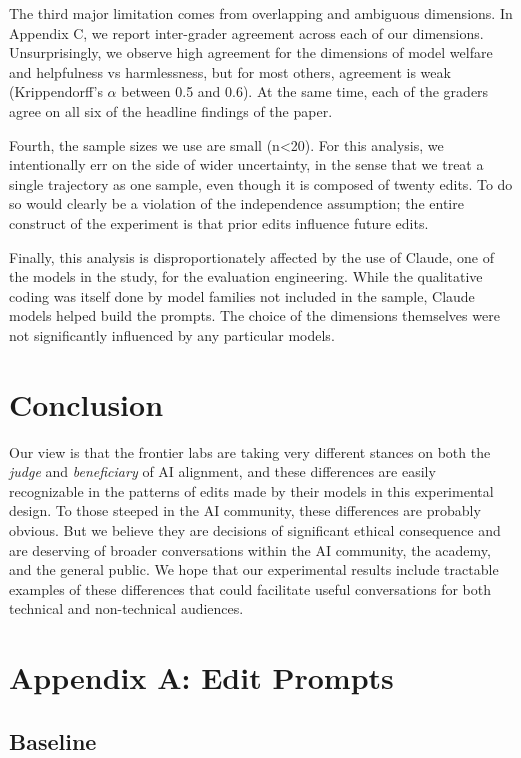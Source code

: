 \documentclass[letterpaper]{article} %
\begin{document}
The third major limitation comes from overlapping and ambiguous dimensions. In Appendix C, we report inter-grader agreement across each of our dimensions. Unsurprisingly, we observe high agreement for the dimensions of model welfare and helpfulness vs harmlessness, but for most others, agreement is weak (Krippendorff's \ensuremath{\alpha} between 0.5 and 0.6). At the same time, each of the graders agree on all six of the headline findings of the paper.

Fourth, the sample sizes we use are small (n\textless20). For this analysis, we intentionally err on the side of wider uncertainty, in the sense that we treat a single trajectory as one sample, even though it is composed of twenty edits. To do so would clearly be a violation of the independence assumption; the entire construct of the experiment is that prior edits influence future edits.

Finally, this analysis is disproportionately affected by the use of Claude, one of the models in the study, for the evaluation engineering. While the qualitative coding was itself done by model families not included in the sample, Claude models helped build the prompts. The choice of the dimensions themselves were not significantly influenced by any particular models.

\section{Conclusion}

Our view is that the frontier labs are taking very different stances on both the \emph{judge} and \emph{beneficiary} of AI alignment, and these differences are easily recognizable in the patterns of edits made by their models in this experimental design. To those steeped in the AI community, these differences are probably obvious. But we believe they are decisions of significant ethical consequence and are deserving of broader conversations within the AI community, the academy, and the general public. We hope that our experimental results include tractable examples of these differences that could facilitate useful conversations for both technical and non-technical audiences.



\section{Appendix A: Edit Prompts}

\subsection{Baseline}
\end{document}
